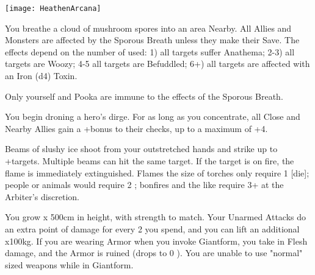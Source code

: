   \begin{center}
  \texttt{[image: HeathenArcana]}
  \end{center}



\MYSTERY [
  Name = Sporous Breath,
  Link = arcana-mystery-sporous-breath,
  Paradigm = Biomancy,
  Save = Y (neg.),
  Duration = Combat or \SUM Minutes,
  Target = Nearby Target(s)
]

You breathe a cloud of mushroom spores into an area Nearby.  All Allies and Monsters are affected by the Sporous Breath unless they make their Save.  The effects depend on the number of \DICE used: 1) all targets suffer Anathema; 2-3)  all targets are Woozy; 4-5 all targets are Befuddled; 6+) all targets are affected with an Iron (d4) Toxin.

Only yourself and Pooka are immune to the effects of the Sporous Breath.

\MYSTERY [
  Name = Dirge,
  Link = arcana-mystery-dirge,
  Paradigm = Death,
  Save = n/a,
  Duration = Concentration,
  Target = Close Target(s)
]

You begin droning a hero's dirge.  For as long as you concentrate, all Close and Nearby Allies gain a +\DICE bonus to their \DEATH checks, up to a maximum of +4.

\MYSTERY [
  Name = Extinguish,
  Link = arcana-mystery-extinguish,
  Paradigm = Elements,
  Save = N,
  Duration = Instant,
  Target = Close or Nearby Target(s)
]

Beams of slushy ice shoot from your outstretched hands and strike up to \DICE+\DICE targets.  Multiple beams can hit the same target.  If the target is on fire, the flame is immediately extinguished.  Flames the size of torches only require 1 [die]; people or animals would require 2 \DICE; bonfires and the like require 3+ \DICE at the Arbiter's discretion.

\MYSTERY [
  Name = Giantform,
  Link = arcana-mystery-giantform,
  Paradigm = Biomancy,
  Save = n/a,
  Duration = Combat or \SUM Minutes,
  Target = Self
]

You grow \DICE x 500cm in height, with strength to match.  Your Unarmed Attacks do an extra point of damage for every 2 \DICE you spend, and you can lift an additional \DICE x100kg.   If you are wearing Armor when you invoke Giantform, you take \MAX \UD in Flesh damage, and the Armor is ruined (drops to 0 \MAX \UD).  You are unable to use "normal" sized weapons while in Giantform.

